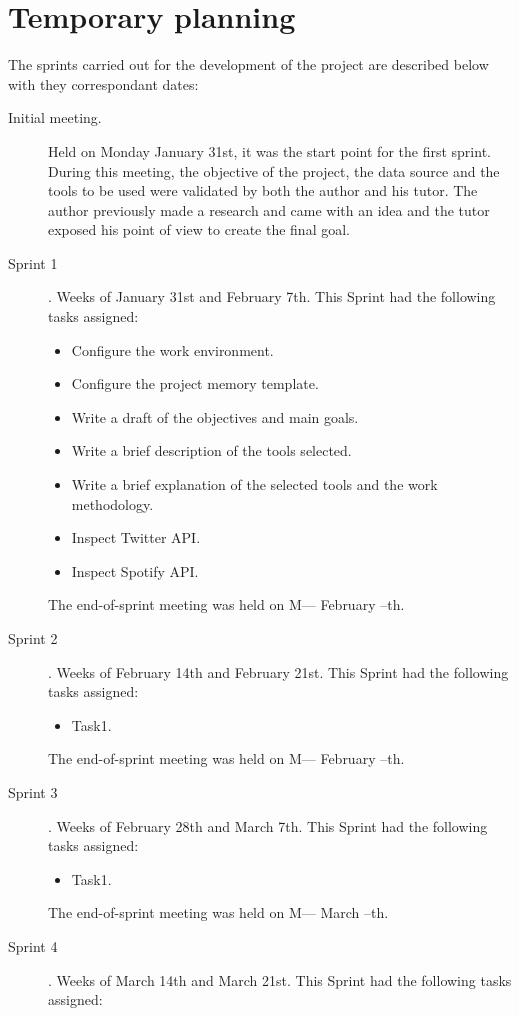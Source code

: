 \section{Temporary planning}
\nonzeroparskip The sprints carried out for the development of the project are described below with they correspondant dates:
\begin{description}
	\item[Initial meeting.] Held on Monday January 31st, it was the start point for the first sprint. During this meeting, the objective of the project, the data source and the tools to be used were validated by both the author and his tutor. The author previously made a research and came with an idea and the tutor exposed his point of view to create the final goal.
	\item[Sprint 1]. Weeks of January 31st and February 7th. This Sprint had the following tasks assigned:
	\begin{itemize}
		\item Configure the work environment.
		\item Configure the project memory template.
		\item Write a draft of the objectives and main goals.
		\item Write a brief description of the tools selected.
		\item Write a brief explanation of the selected tools and the work methodology.
		\item Inspect Twitter API.
		\item Inspect Spotify API.
	\end{itemize}
	The end-of-sprint meeting was held on M--- February --th.
	\item[Sprint 2]. Weeks of February 14th and February 21st. This Sprint had the following tasks assigned:
	\begin{itemize}
		\item Task1.
	\end{itemize}
	The end-of-sprint meeting was held on M--- February --th.
	\item[Sprint 3]. Weeks of February 28th and March 7th. This Sprint had the following tasks assigned:
	\begin{itemize}
		\item Task1.
	\end{itemize}
	The end-of-sprint meeting was held on M--- March --th.
	\item[Sprint 4]. Weeks of March 14th and March 21st. This Sprint had the following tasks assigned:
	\begin{itemize}

\end{itemize}
\end{description}

